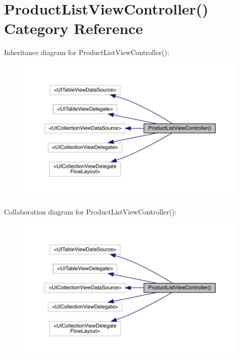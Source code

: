 \hypertarget{category_product_list_view_controller_07_08}{}\section{Product\+List\+View\+Controller() Category Reference}
\label{category_product_list_view_controller_07_08}


Inheritance diagram for Product\+List\+View\+Controller()\+:\nopagebreak
\begin{figure}[H]
\begin{center}
\leavevmode
\includegraphics[width=350pt]{category_product_list_view_controller_07_08__inherit__graph}
\end{center}
\end{figure}


Collaboration diagram for Product\+List\+View\+Controller()\+:\nopagebreak
\begin{figure}[H]
\begin{center}
\leavevmode
\includegraphics[width=350pt]{category_product_list_view_controller_07_08__coll__graph}
\end{center}
\end{figure}
